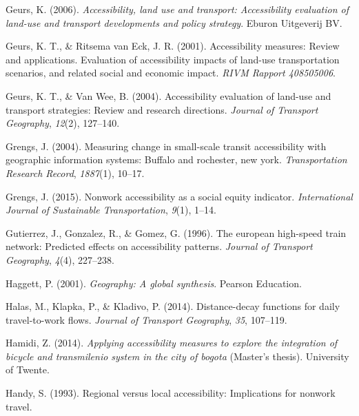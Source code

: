 \documentclass[
11pt, %
oneside, %
english, %
singlespacing, %
]{macthesis} %
\newlength{\cslhangindent}
\newenvironment{CSLReferences}[2] %
 {%
  \setlength{\parindent}{0pt}
  \ifodd #1 \everypar{\setlength{\hangindent}{\cslhangindent}}\ignorespaces\fi
  \ifnum #2 > 0
  \setlength{\parskip}{#2\baselineskip}
  \fi
 }%
 {}
\begin{document}
\begin{CSLReferences}{1}{0}
\leavevmode{}%
Geurs, K. (2006). \emph{Accessibility, land use and transport: Accessibility evaluation of land-use and transport developments and policy strategy}. Eburon Uitgeverij BV.

\leavevmode{}%
Geurs, K. T., \& Ritsema van Eck, J. R. (2001). Accessibility measures: Review and applications. Evaluation of accessibility impacts of land-use transportation scenarios, and related social and economic impact. \emph{RIVM Rapport 408505006}.

\leavevmode{}%
Geurs, K. T., \& Van Wee, B. (2004). Accessibility evaluation of land-use and transport strategies: Review and research directions. \emph{Journal of Transport Geography}, \emph{12}(2), 127--140.

\leavevmode{}%
Grengs, J. (2004). Measuring change in small-scale transit accessibility with geographic information systems: Buffalo and rochester, new york. \emph{Transportation Research Record}, \emph{1887}(1), 10--17.

\leavevmode{}%
Grengs, J. (2015). Nonwork accessibility as a social equity indicator. \emph{International Journal of Sustainable Transportation}, \emph{9}(1), 1--14.

\leavevmode{}%
Gutierrez, J., Gonzalez, R., \& Gomez, G. (1996). The european high-speed train network: Predicted effects on accessibility patterns. \emph{Journal of Transport Geography}, \emph{4}(4), 227--238.

\leavevmode{}%
Haggett, P. (2001). \emph{Geography: A global synthesis}. Pearson Education.

\leavevmode{}%
Halas, M., Klapka, P., \& Kladivo, P. (2014). Distance-decay functions for daily travel-to-work flows. \emph{Journal of Transport Geography}, \emph{35}, 107--119.

\leavevmode{}%
Hamidi, Z. (2014). \emph{Applying accessibility measures to explore the integration of bicycle and transmilenio system in the city of bogota} (Master's thesis). University of Twente.

\leavevmode{}%
Handy, S. (1993). Regional versus local accessibility: Implications for nonwork travel.


\end{CSLReferences}
\end{document}
